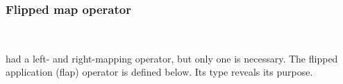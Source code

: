 \documentclass[authoryear, acmsmall, screen, review, nonacm]{acmart}
\begin{document}
\subsubsection{Flipped map operator}~

 had a left- and right-mapping operator, but only one is necessary. The flipped application (flap) operator is defined below. Its type reveals its purpose.

\begin{code}%
\>[0]\AgdaSpace{}%
\AgdaSymbol{:}\AgdaSpace{}%
\AgdaSpace{}%
\AgdaSpace{}%
\AgdaSymbol{(}\AgdaOperator{\AgdaInductiveConstructor{R[}}\AgdaSpace{}%
\AgdaSpace{}%
\AgdaSpace{}%
\AgdaSpace{}%
\AgdaOperator{\AgdaInductiveConstructor{]}}\AgdaSpace{}%
\AgdaSpace{}%
\AgdaSpace{}%
\AgdaSpace{}%
\AgdaOperator{\AgdaInductiveConstructor{R[}}\AgdaSpace{}%
\AgdaSpace{}%
\AgdaOperator{\AgdaInductiveConstructor{]}}\AgdaSymbol{)}\<%
\\
\>[0]\AgdaSpace{}%
\AgdaSymbol{=}\AgdaSpace{}%
\AgdaSpace{}%
\AgdaSymbol{(}\AgdaSpace{}%
\AgdaSymbol{((}\AgdaSpace{}%
\AgdaSymbol{((}\AgdaSpace{}%
\AgdaSymbol{)}\AgdaSpace{}%
\AgdaSpace{}%
\AgdaSymbol{(}\AgdaSpace{}%
\AgdaSymbol{(}\AgdaSpace{}%
\AgdaSymbol{))))}\AgdaSpace{}%
\AgdaOperator{\AgdaInductiveConstructor{<\$>}}\AgdaSpace{}%
\AgdaSymbol{(}\AgdaSpace{}%
\AgdaSymbol{(}\AgdaSpace{}%
\AgdaSymbol{))))}\<%
\\
%
\\[\AgdaEmptyExtraSkip]%
\>[0]\AgdaSpace{}%
\AgdaSymbol{:}\AgdaSpace{}%
\AgdaSpace{}%
\AgdaSpace{}%
\AgdaSymbol{(}\AgdaOperator{\AgdaInductiveConstructor{R[}}\AgdaSpace{}%
\AgdaSpace{}%
\AgdaSpace{}%
\AgdaSpace{}%
\AgdaOperator{\AgdaInductiveConstructor{]}}\AgdaSymbol{)}\AgdaSpace{}%

\end{code}
\end{document}

